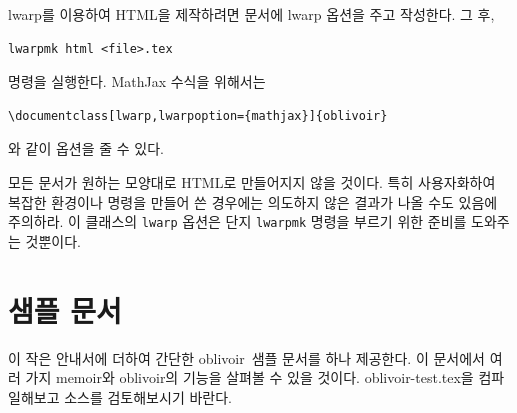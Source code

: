 \documentclass[
	12pt,
	a4paper,
	kosection,
	footnote,
	nobookmarks,
	microtype,
	figtabcapt,
]{oblivoir}
\newcommand\obclass{ob\-liv\-oir\oblivoirallowbreak}
\begin{document}
\textsf{lwarp}를 이용하여 HTML을 제작하려면 문서에 \textsf{lwarp} 
옵션을 주고 작성한다. 그 후,
\begin{verbatim}
lwarpmk html <file>.tex
\end{verbatim}
명령을 실행한다. MathJax 수식을 위해서는 
\begin{verbatim}
\documentclass[lwarp,lwarpoption={mathjax}]{oblivoir}
\end{verbatim}
와 같이 옵션을 줄 수 있다.

모든 문서가 원하는 모양대로 HTML로 만들어지지 않을 것이다. 특히
사용자화하여 복잡한 환경이나 명령을 만들어 쓴 경우에는 의도하지 않은
결과가 나올 수도 있음에 주의하라. 이 클래스의 \verb|lwarp| 옵션은
단지 \verb|lwarpmk| 명령을 부르기 위한 준비를 도와주는 것뿐이다.

\section{샘플 문서}

이 작은 안내서에 더하여 간단한 \obclass\ 샘플 문서를 하나 제공한다.
이 문서에서 여러 가지 memoir와 \obclass 의 기능을 살펴볼 수 있을 것이다.
oblivoir-test.tex을 컴파일해보고 소스를 검토해보시기 바란다.
\end{document}
